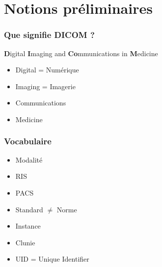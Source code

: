 \section{Notions pr\'eliminaires}

	\frame
	{
		\frametitle{Que signifie DICOM ?}
		
		\textbf{D}igital \textbf{I}maging and \textbf{Co}mmunications in \textbf{M}edicine
		\begin{itemize}
			\item Digital = Num\'erique
		    	\item Imaging = Imagerie
		    	\item Communications
		    	\item Medicine
		\end{itemize}
	}
	
	\frame
	{
		\frametitle{Vocabulaire}
		\begin{itemize}
			\item Modalit\'e
			\item RIS
			\item PACS
			\item Standard $\neq$ Norme
			\item Instance
			\item Clunie
			\item UID = Unique Identifier
		\end{itemize}
	}
	
